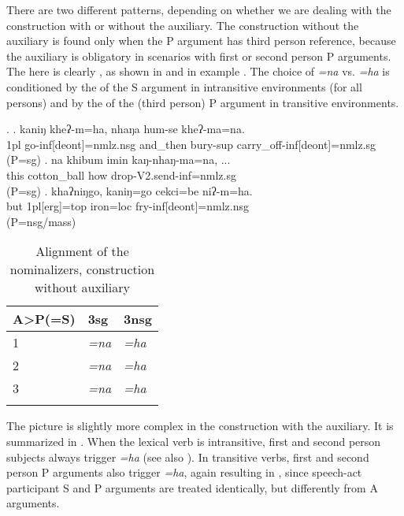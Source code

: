 There are two different  patterns, depending on whether we are dealing with the construction  with or without the auxiliary. The construction without the auxiliary is  found only when the P argument has third person reference, because the auxiliary is obligatory in scenarios with first or second person P arguments. The   here is clearly , as shown in  and in example \Next. The choice of \emph{=na} vs. \emph{=ha} is conditioned by the  of the S argument in intransitive environments (for all persons) and by the  of the (third person) P argument in transitive environments. 


\ex. \ag. kaniŋ kheʔ-m=ha,                       nhaŋa   hum-se         kheʔ-ma=na.\\
{\sc 1pl} go{\sc -inf[deont]=nmlz.nsg} and\_then bury{\sc -sup} carry\_off{\sc -inf[deont]=nmlz.sg}\\
 (P=sg) 
\bg. na   khibum  imin kaŋ-nhaŋ-ma=na, ...\\
this cotton\_ball how drop-{\sc V2.send-inf=nmlz.sg}\\
 (P=sg)  
\bg.  khaʔniŋgo, kaniŋ=go       cekci=be    niʔ-m=ha.\\
but {\sc 1pl[erg]=top}  iron{\sc =loc} fry-{\sc inf[deont]=nmlz.nsg}\\
 (P=nsg/mass) 


\begin{table}[htp]
\begin{center}
\begin{tabular}{lll}
\lsptoprule
{\bf A>P(=S)} 	&	{\sc 3sg}&{\sc 3nsg}\\
\midrule
1		&\it =na &  \it =ha\\
\midrule
2		&\it =na& \it =ha\\
\midrule
3		&\it =na&\it =ha\\
\lspbottomrule
\end{tabular}
\caption{Alignment of the nominalizers, construction without auxiliary}\label{nom-align-without}
\end{center}
\end{table}
 
 
The picture is slightly more complex in the construction with the auxiliary. It is summarized in 
. When the lexical verb is intransitive, first and second person subjects always trigger \emph{=ha} (see also \Next). In transitive verbs, first and second person P arguments also trigger \emph{=ha}, again resulting in  , since speech-act participant S and P arguments are treated identically, but differently from A arguments. 

